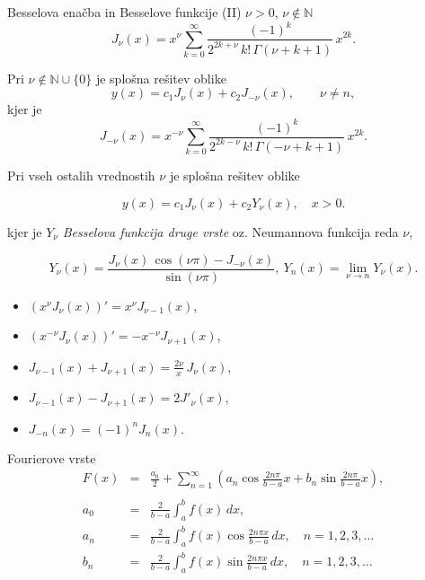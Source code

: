 \documentclass[a4paper,10pt]{article}
\begin{document}
\begin{multicols}{2}
\begin{formulaBox}{Besselova enačba in Besselove funkcije}
(II) $\nu > 0$, $\nu\notin \mathbb{N}$
	$$
J_\nu(x)=x^\nu \sum_{k=0}^\infty \frac{(-1)^k }{2^{2k+\nu}\,k!\,\Gamma (\nu+k+1)}\, x^{2k}.$$


Pri $\nu \notin \mathbb{N}\cup \{0\}$ je splošna rešitev oblike
$$y(x)=c_1 J_{\nu} (x)+c_2 J_{-\nu} (x),\qquad \nu\ne n, $$
kjer je
	$$	J_{-\nu}(x)=x^{-\nu} \sum_{k=0}^\infty \frac{(-1)^k }{2^{2k-\nu}\,k!\,\Gamma (-\nu+k+1)}\, x^{2k}.$$


Pri vseh ostalih vrednostih $\nu$ je splošna rešitev oblike

$$y(x)=c_1 J_{\nu} (x)+c_2 Y_{\nu} (x),\quad x>0. $$

kjer je $Y_{\nu}$ \emph{Besselova funkcija druge vrste} oz. {Neumannova funkcija} reda $\nu$, 

	$$	Y_\nu (x)=\frac{J_\nu (x)\, \cos (\nu \pi)-J_{-\nu}(x)}{\sin (\nu \pi)},\ Y_n (x)=\lim_{\nu\to n} Y_\nu (x).$$


		\begin{itemize}
			\item $\left( x^\nu J_\nu (x)\right)'=x^\nu J_{\nu-1}(x)$,
			\item $\left( x^{-\nu} J_\nu (x)\right)'=-x^{-\nu} J_{\nu+1}(x)$,
			\item $J_{\nu-1}(x)+J_{\nu+1}(x)=\frac{2\nu}{x}\,J_\nu (x)$,
			\item $J_{\nu-1}(x)-J_{\nu+1}(x)=2 J'_\nu (x)$,
			\item $J_{-n}(x)=(-1)^n J_n(x).$
		\end{itemize}
\end{formulaBox}



\begin{formulaBox}{Fourierove vrste}
	\begin{eqnarray*}
				F(x)&=&\frac{a_0}{2} + \sum_{n=1}^\infty \left(a_n \cos \frac{2 n\pi}{b-a}x +b_n \sin \frac{2 n\pi}{b-a}x\right),\\	
				&\  & \\
				a_0&=&\frac{2}{b-a}\int_{a}^b f(x)\, dx, \\[3mm]  
				a_n&=&\frac{2}{b-a}\int_{a}^b f(x)\cos \frac{2n\pi x}{b-a}\, dx,\quad n=1,2,3,\ldots\\[3mm]  
				b_n&=&\frac{2}{b-a}\int_{a}^b f(x)\sin \frac{2n\pi x}{b-a}\, dx,\quad n=1,2,3,\ldots
	\end{eqnarray*}


\end{formulaBox}
\end{multicols}
\end{document}
